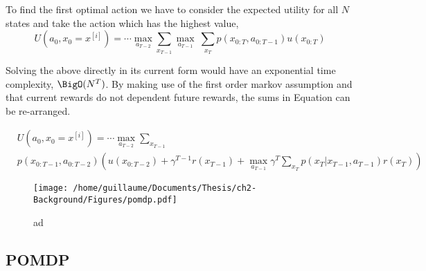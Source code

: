 To find the first optimal action we have to consider the expected utility for all $N$ states and take the action which has the highest value,
\begin{equation}\label{eq:max_util}
  U(a_0,x_0 = x^{[i]}) =  \cdots \max_{a_{T-2}} \sum\limits_{x_{T-1}} \max_{a_{T-1}} \ \sum\limits_{x_T} p(x_{0:T},a_{0:T-1})  u(x_{0:T})
\end{equation}

Solving the above directly in its current form would have an exponential time complexity, $\BigO(N^T)$. By making use of the first order 
markov assumption and that current rewards do not dependent future rewards, the sums in Equation \label{eq:max_util} can be re-arranged.


\begin{align}
 &U(a_0,x_0=x^{[i]}) =\cdots \max_{a_{T-2}} \sum\limits_{x_{T-1}}  \nonumber\\
 &p(x_{0:T-1},a_{0:T-2})  \left( u(x_{0:T-2}) + \gamma^{T-1}r(x_{T-1}) + \max_{a_{T-1}} \gamma^{T} \sum\limits_{x_{T}} p(x_{T}|x_{T-1},a_{T-1}) r(x_{T}) \right)
\end{align}










\begin{figure}[h]
 \centering
 \texttt{[image: /home/guillaume/Documents/Thesis/ch2-Background/Figures/pomdp.pdf]}
  \caption{ad}
\end{figure}

\subsection{POMDP}

